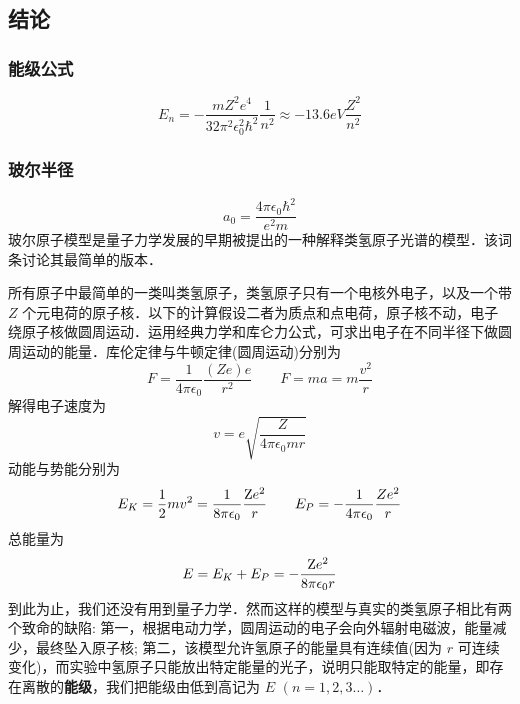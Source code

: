 
\subsection{结论}
\subsubsection{能级公式}
\begin{equation}
{E_n} =  - \frac{{m{Z^2}{e^4}}}{{32{\pi ^2}\epsilon _0^2{\hbar ^2}}}\frac{1}{{{n^2}}} \approx  - 13.6eV\frac{{{Z^2}}}{{{n^2}}}
\end{equation}
\subsubsection{玻尔半径}
\begin{equation}
{a_0} = \frac{{4\pi {\epsilon _0}{\hbar ^2}}}{{{e^2}m}}
\end{equation}
玻尔原子模型是量子力学发展的早期被提出的一种解释类氢原子光谱的模型．该词条讨论其最简单的版本．

所有原子中最简单的一类叫类氢原子，类氢原子只有一个电核外电子，以及一个带 $Z$ 个元电荷的原子核．以下的计算假设二者为质点和点电荷，原子核不动，电子绕原子核做圆周运动．运用经典力学和库仑力公式，可求出电子在不同半径下做圆周运动的能量．库伦定律与牛顿定律(圆周运动)分别为
\begin{equation}
F = \frac{1}{{4\pi {\epsilon _0}}}\frac{{(Ze)e}}{{{r^2}}}
\qquad
F = ma = m\frac{{{v^2}}}{r}
\end{equation}
解得电子速度为
\begin{equation}\label{BohrMd_eq2}
v = e\sqrt {\frac{Z}{{4\pi {\epsilon _0}mr}}} 
\end{equation}
动能与势能分别为
\begin{equation}
{E_K} = \frac{1}{2}m{v^2} = \frac{1}{{8\pi {\epsilon _0}}}\frac{{{\rm{Z}}{e^2}}}{r}
\qquad
{E_P} =  - \frac{1}{{4\pi {\epsilon _0}}}\frac{{Z{e^2}}}{r}
\end{equation}   
总能量为
\begin{equation}\label{BohrMd_eq4}
E = {E_K} + {E_P} =  - \frac{{{\rm{Z}}{e^2}}}{{8\pi {\epsilon _0}r}}
\end{equation}
到此为止，我们还没有用到量子力学．然而这样的模型与真实的类氢原子相比有两个致命的缺陷: 第一，根据电动力学，圆周运动的电子会向外辐射电磁波，能量减少，最终坠入原子核; 第二，该模型允许氢原子的能量具有连续值(因为 $r$ 可连续变化)，而实验中氢原子只能放出特定能量的光子，说明只能取特定的能量，即存在离散的\textbf{能级}，我们把能级由低到高记为 $E$  $(n = 1,2,3\dots)$． 


